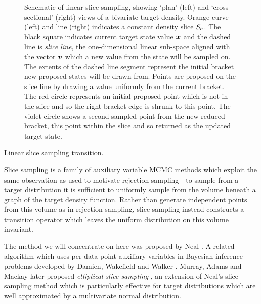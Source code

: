 \begin{figure}[t]
\centering
\begin{subfigure}[b]{.46\linewidth}
\centering
{}
\vspace{3mm}
\end{subfigure}
\begin{subfigure}[b]{.46\linewidth}
\centering
{}
\end{subfigure}
\caption[Visualisation of linear slice sampling.]{Schematic of linear slice sampling, showing `plan' (left) and `cross-sectional' (right) views of a bivariate target density. Orange curve (left) and line (right) indicates a constant density slice $\mathit{S}_h$. The black square indicates current target state value $\boldsymbol{x}$ and the dashed line is \emph{slice line}, the one-dimensional linear sub-space aligned with the vector $\boldsymbol{v}$ which a new value from the state will be sampled on. The extents of the dashed line segment represent the initial bracket new proposed states will be drawn from. Points are proposed on the slice line by drawing a value uniformly from the current bracket. The red circle represents an initial proposed point which is not in the slice and so the right bracket edge is shrunk to this point. The violet circle shows a second sampled point from the new reduced bracket, this point within the slice and so returned as the updated target state.}
\label{fig:slice-sampling}
\end{figure}

\begin{algorithm}[t]
\caption{Linear slice sampling transition.}
\label{alg:linear-slice-sampling}

\end{algorithm}

Slice sampling is a family of auxiliary variable \ac{MCMC} methods which exploit the same observation as used to motivate rejection sampling - to sample from a target distribution it is sufficient to uniformly sample from the volume beneath a graph of the target density function. Rather than generate independent points from this volume as in rejection samp\-ling, slice sampling instead constructs a transition operator which leaves the uniform distribution on this volume invariant.

The method we will concentrate on here was proposed by Neal \citep{neal1997markov,neal2003slice}. A related algorithm which uses per data-point auxiliary variables in Bayesian inference problems developed by Damien, Wakefield and Walker \citep{damien1999gibbs}. Murray, Adams and Mackay later proposed \emph{elliptical slice sampling} \citep{murray2010elliptical}, an extension of Neal's slice sampling method which is particularly effective for target distributions which are well approximated by a multivariate normal distribution. %

